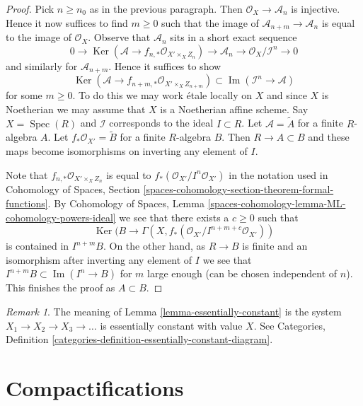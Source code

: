 \documentclass{stacks-project}
\theoremstyle{plain}
\theoremstyle{definition}
\theoremstyle{remark}
\newtheorem{remark}[subsection]{Remark}
\numberwithin{equation}{subsection}
\def\Spec{\mathop{\mathrm{Spec}}}
\def\Ker{\mathop{\mathrm{Ker}}}
\def\Im{\mathop{\mathrm{Im}}}
\begin{document}
\begin{proof}
\medskip\noindent
Pick $n \geq n_0$ as in the previous paragraph. Then
$\mathcal{O}_X \to \mathcal{A}_n$ is injective. Hence it now
suffices to find $m \geq 0$ such that the image of
$\mathcal{A}_{n + m} \to \mathcal{A}_n$ is equal
to the image of $\mathcal{O}_X$. Observe that $\mathcal{A}_n$
sits in a short exact sequence
$$
0 \to \Ker(\mathcal{A} \to f_{n, *}\mathcal{O}_{X' \times_X Z_n})
\to \mathcal{A}_n \to \mathcal{O}_X/\mathcal{I}^n \to 0
$$
and similarly for $\mathcal{A}_{n + m}$. Hence it suffices to show
$$
\Ker(\mathcal{A} \to f_{n + m, *}\mathcal{O}_{X' \times_X Z_{n + m}})
\subset
\Im(\mathcal{I}^n \to \mathcal{A})
$$
for some $m \geq 0$. To do this we may work \'etale locally on
$X$ and since $X$ is Noetherian we may assume that $X$ is
a Noetherian affine scheme. Say $X = \Spec(R)$ and $\mathcal{I}$
corresponds to the ideal $I \subset R$. Let $\mathcal{A} = \widetilde{A}$
for a finite $R$-algebra $A$. Let $f_*\mathcal{O}_{X'} = \widetilde{B}$
for a finite $R$-algebra $B$. Then $R \to A \subset B$ and these maps
become isomorphisms on inverting any element of $I$.

\medskip\noindent
Note that $f_{n, *}\mathcal{O}_{X' \times_X Z_n}$
is equal to $f_*(\mathcal{O}_{X'}/I^n\mathcal{O}_{X'})$
in the notation used in Cohomology of Spaces, Section
\ref{spaces-cohomology-section-theorem-formal-functions}.
By Cohomology of Spaces, Lemma
\ref{spaces-cohomology-lemma-ML-cohomology-powers-ideal}
we see that there exists a $c \geq 0$ such that
$$
\Ker(B \to \Gamma(X, f_*(\mathcal{O}_{X'}/I^{n + m + c}\mathcal{O}_{X'}))
$$
is contained in $I^{n + m}B$. On the other hand, as $R \to B$ is
finite and an isomorphism after inverting any element of $I$
we see that $I^{n + m}B \subset \Im(I^n \to B)$ for $m$ large enough
(can be chosen independent of $n$). This finishes the proof as $A \subset B$.
\end{proof}

\begin{remark}
\label{remark-essentially-constant}
The meaning of Lemma \ref{lemma-essentially-constant}
is the system $X_1 \to X_2 \to X_3 \to \ldots$ is essentially
constant with value $X$. See Categories, Definition
\ref{categories-definition-essentially-constant-diagram}.
\end{remark}






\section{Compactifications}
\label{section-compactifications}
\end{document}
